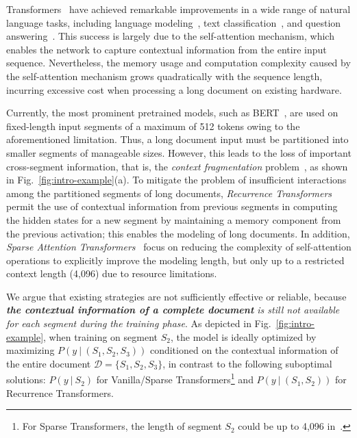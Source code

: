\documentclass[11pt,a4paper]{article}
\begin{document}
Transformers~\citep{vaswani2017attention} have achieved remarkable improvements in a wide range of natural language tasks, including language modeling~\citep{transformer_xl}, text classification~\citep{yang2019xlnet}, and question answering~\citep{devlin2018bert, radford2019language}. This success is largely due to the self-attention mechanism, which enables the network to capture contextual information from the entire input sequence. Nevertheless, the memory usage and computation complexity caused by the self-attention mechanism grows quadratically with the sequence length, incurring excessive cost when processing a long document on existing hardware.

Currently, the most prominent pretrained models, such as BERT~\citep{devlin2018bert}, are used on fixed-length input segments of a maximum of 512 tokens owing to the aforementioned limitation. Thus, a long document input must be partitioned into smaller segments of manageable sizes. However, this leads to the loss of important cross-segment information, that is, the \textit{context fragmentation} problem~\citep{transformer_xl}, as shown in Fig.~\ref{fig:intro-example}(a). To mitigate the problem of insufficient interactions among the partitioned segments of long documents, \textit{Recurrence Transformers}~\citep{transformer_xl, compressive_transformer} permit the use of contextual information from previous segments in computing the hidden states for a new segment by maintaining a memory component from the previous activation; this enables the modeling of long documents. In addition, \textit{Sparse Attention Transformers}~\citep{sparse_transformer,tay2020sparse,beltagy2020longformer,zaheer2020big} focus on reducing the complexity of self-attention operations to explicitly improve the modeling length, but only up to a restricted context length (4,096) due to resource limitations. 

We argue that existing strategies are not sufficiently effective or reliable, because \textit{\textbf{the contextual information of a complete document} is still not available for each segment during the training phase}. As depicted in Fig.~\ref{fig:intro-example}, when training on segment $S_2$, the model is ideally optimized by maximizing $P(y ~|~ (S_1, S_2, S_3))$ conditioned on the contextual information of the entire document $\mathcal{D} = \{S_1, S_2, S_3\}$, in contrast to the following suboptimal solutions: $P(y ~|~ S_2)$ for Vanilla/Sparse Transformers\footnote{For Sparse Transformers, the length of segment $S_2$ could be up to 4,096 in~\citet{beltagy2020longformer,zaheer2020big}.} and $P(y ~|~ (S_1, S_2))$ for Recurrence Transformers.
\end{document}
